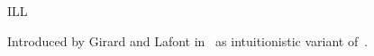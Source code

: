 \begin{entry}{ILL}
\begin{calculus}


\end{calculus}



\begin{history}
  Introduced by Girard and Lafont in~\cite{lafont1987tapsoft} as intuitionistic variant of~.
\end{history}




%
%
%
%
%
%
% 
%






\end{entry}
